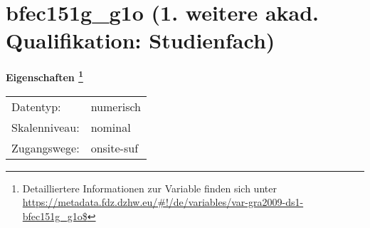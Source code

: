 
    \setcounter{footnote}{0}

    \vspace*{-1.8cm}
	\section{bfec151g\_g1o (1. weitere akad. Qualifikation: Studienfach)}
	\label{section:bfec151g_g1o}



    \vspace*{0.5cm}
    \noindent\textbf{Eigenschaften
	\footnote{Detailliertere Informationen zur Variable finden sich unter
		\url{https://metadata.fdz.dzhw.eu/\#!/de/variables/var-gra2009-ds1-bfec151g_g1o$}}}\\
	\begin{tabularx}{\hsize}{@{}lX}
	Datentyp: & numerisch \\
	Skalenniveau: & nominal \\
	Zugangswege: &
	  onsite-suf
 \\
    \end{tabularx}



